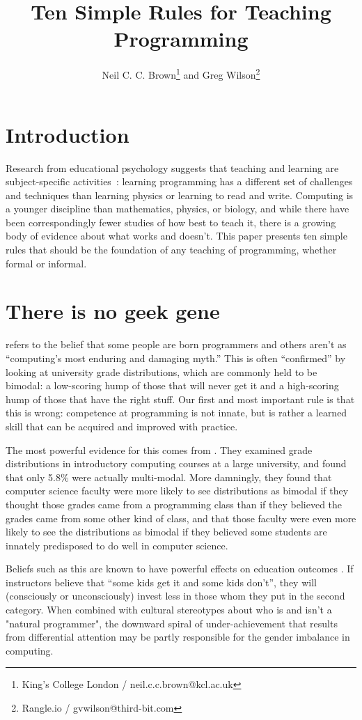 \documentclass{article}
\title{Ten Simple Rules for Teaching Programming}
\author{Neil C. C. Brown\footnote{King's College London / neil.c.c.brown@kcl.ac.uk} and Greg Wilson\footnote{Rangle.io / gvwilson@third-bit.com}}
\begin{document}
\maketitle

\section*{Introduction}

Research from educational psychology suggests that teaching and learning are subject-specific
activities~\citep{mayer-subject}: learning programming has a different set of challenges and techniques
than learning physics or learning to read and write.  Computing is a younger discipline than
mathematics, physics, or biology, and while there have been correspondingly fewer studies of how best to teach it,
there is a growing body of evidence about what works and doesn't.
This paper presents ten simple rules that should be the foundation of any teaching of programming, whether
formal or informal.

\section{There is no geek gene}\label{gene}

\citet{guzdial-myths} refers to the belief that some people are born programmers and others aren't
as ``computing's most enduring and damaging myth.''
This is often ``confirmed'' by looking at university grade distributions,
which are commonly held to be bimodal:
a low-scoring hump of those that will never get it
and a high-scoring hump of those that have the right stuff.
Our first and most important rule is that this is wrong:
competence at programming is not innate,
but is rather a learned skill that can be acquired and improved with practice.

The most powerful evidence for this comes from \citet{patitsas-bimodal}.
They examined grade distributions in introductory computing courses at a large university,
and found that only 5.8\% were actually multi-modal.
More damningly,
they found that computer science faculty were more likely to see distributions as bimodal
if they thought those grades came from a programming class
than if they believed the grades came from some other kind of class,
and that those faculty were even more likely to see the distributions as bimodal
if they believed some students are innately predisposed to do well in computer science.

Beliefs such as this are known to have powerful effects on education outcomes
\citep{alvidrez-weinstein,brophy,jussim-eccles}.
If instructors believe that ``some kids get it and some kids don't'',
they will (consciously or unconsciously) invest less in those whom they put in the second category.
When combined with cultural stereotypes about who is and isn't a "natural programmer",
the downward spiral of under-achievement that results from differential attention
may be partly responsible for the gender imbalance in computing.
\end{document}
